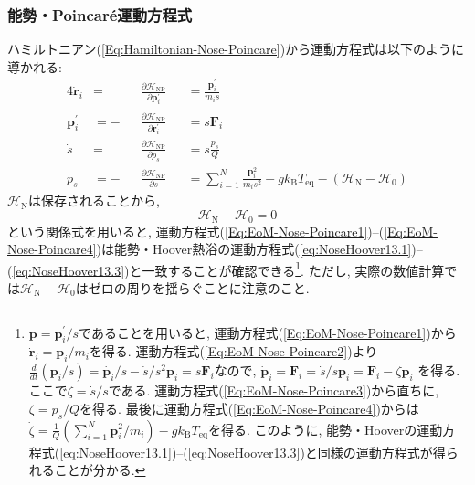 \subsubsection{能勢・Poincar\'{e}運動方程式}
ハミルトニアン(\ref{Eq:Hamiltonian-Nose-Poincare})から運動方程式は以下のように導かれる:
\begin{alignat}{4}
  \dot{\bm{r}}_{i}
  &=&&
  \frac{\partial \mathcal{H}_{\mathrm{NP}}}{\partial \bm{p}_{i}^{\prime}}
  &&=
  \frac{\bm{p}_{i}^{\prime}}{m_{i}s}
  \label{Eq:EoM-Nose-Poincare1} \\
  \dot{\bm{p}_{i}^{\prime}}
  &=-&&
  \frac{\partial \mathcal{H}_{\mathrm{NP}}}{\partial \bm{r}_{i}^{\prime}}
  &&=
  s\bm{F}_{i}
  \label{Eq:EoM-Nose-Poincare2} \\
  \dot{s}
  &=&&
  \frac{\partial \mathcal{H}_{\mathrm{NP}}}{\partial p_{s}}
  &&=
  s \frac{p_{s}}{Q}
  \label{Eq:EoM-Nose-Poincare3} \\
  \dot{p_{s}}
  &=-&&
  \frac{\partial \mathcal{H}_{\mathrm{NP}}}{\partial s}
  &&=
  \sum_{i=1}^{N}
  \frac{\bm{p}_{i}^{2}}{m_{i}s^{2}}
  - g k_{\mathrm{B}} T_{\mathrm{eq}}
  - (\mathcal{H}_{\mathrm{N}} - \mathcal{H}_{0})
  \label{Eq:EoM-Nose-Poincare4}
\end{alignat}
$\mathcal{H}_{\mathrm{N}}$は保存されることから,　
\begin{equation}
  \mathcal{H}_{\mathrm{N}} - \mathcal{H}_{0} = 0
\end{equation}
という関係式を用いると, 運動方程式(\ref{Eq:EoM-Nose-Poincare1})--(\ref{Eq:EoM-Nose-Poincare4})は能勢・Hoover熱浴の運動方程式(\ref{eq:NoseHoover13.1})--(\ref{eq:NoseHoover13.3})と一致することが確認できる\footnote{
  $\bm{p}= \bm{p}_{i}^{\prime}/s$であることを用いると, 
  運動方程式(\ref{Eq:EoM-Nose-Poincare1})から$\dot{\bm{r}}_{i} = \bm{p}_{i} / m_{i}$を得る.
  運動方程式(\ref{Eq:EoM-Nose-Poincare2})より
  $\frac{d}{dt}(\bm{p}_{i}/s)
  = \dot{\bm{p}_{i}}/s - \dot{s}/s^{2} \bm{p}_{i}
  = s\bm{F}_{i}$なので,
  $\dot{\bm{p}}_{i}
  = \bm{F}_{i}
  = \dot{s}/s \bm{p}_{i}
  = \bm{F}_{i} - \zeta \bm{p}_{i}$
  を得る. ここで$\zeta = \dot{s}/s$である.
  運動方程式(\ref{Eq:EoM-Nose-Poincare3})から直ちに, 
  $\zeta = p_{s} / Q$を得る.
  最後に運動方程式(\ref{Eq:EoM-Nose-Poincare4})からは
  $\dot{\zeta} = \frac{1}{Q}(\sum_{i=1}^{N} \bm{p}_{i}^{2}/m_{i}) - g k_{\mathrm{B}} T_{\mathrm{eq}}$を得る.
  このように, 能勢・Hooverの運動方程式(\ref{eq:NoseHoover13.1})--(\ref{eq:NoseHoover13.3})と同様の運動方程式が得られることが分かる.
}.
ただし, 実際の数値計算では$\mathcal{H}_{\mathrm{N}} - \mathcal{H}_{0}$はゼロの周りを揺らぐことに注意のこと.

